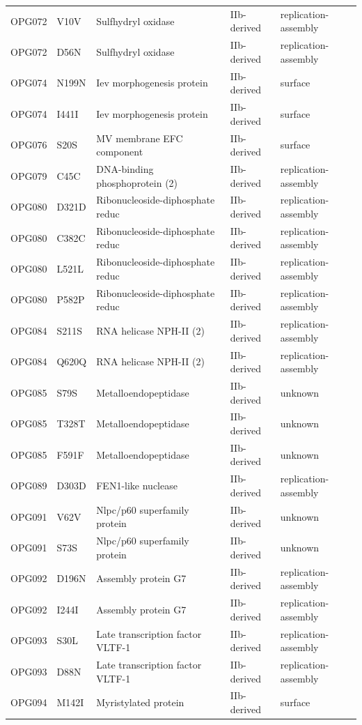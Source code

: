 \documentclass[11pt]{article}
\begin{document}
\begin{longtable}{lllll}
OPG072 & V10V & Sulfhydryl oxidase & IIb-derived & replication-assembly \\
OPG072 & D56N & Sulfhydryl oxidase & IIb-derived & replication-assembly \\
OPG074 & N199N & Iev morphogenesis protein & IIb-derived & surface \\
OPG074 & I441I & Iev morphogenesis protein & IIb-derived & surface \\
OPG076 & S20S & MV membrane EFC component & IIb-derived & surface \\
OPG079 & C45C & DNA-binding phosphoprotein (2) & IIb-derived & replication-assembly \\
OPG080 & D321D & Ribonucleoside-diphosphate reduc & IIb-derived & replication-assembly \\
OPG080 & C382C & Ribonucleoside-diphosphate reduc & IIb-derived & replication-assembly \\
OPG080 & L521L & Ribonucleoside-diphosphate reduc & IIb-derived & replication-assembly \\
OPG080 & P582P & Ribonucleoside-diphosphate reduc & IIb-derived & replication-assembly \\
OPG084 & S211S & RNA helicase NPH-II (2) & IIb-derived & replication-assembly \\
OPG084 & Q620Q & RNA helicase NPH-II (2) & IIb-derived & replication-assembly \\
OPG085 & S79S & Metalloendopeptidase & IIb-derived & unknown \\
OPG085 & T328T & Metalloendopeptidase & IIb-derived & unknown \\
OPG085 & F591F & Metalloendopeptidase & IIb-derived & unknown \\
OPG089 & D303D & FEN1-like nuclease & IIb-derived & replication-assembly \\
OPG091 & V62V & Nlpc/p60 superfamily protein & IIb-derived & unknown \\
OPG091 & S73S & Nlpc/p60 superfamily protein & IIb-derived & unknown \\
OPG092 & D196N & Assembly protein G7 & IIb-derived & replication-assembly \\
OPG092 & I244I & Assembly protein G7 & IIb-derived & replication-assembly \\
OPG093 & S30L & Late transcription factor VLTF-1 & IIb-derived & replication-assembly \\
OPG093 & D88N & Late transcription factor VLTF-1 & IIb-derived & replication-assembly \\
OPG094 & M142I & Myristylated protein & IIb-derived & surface \\

\end{longtable}
\end{document}
